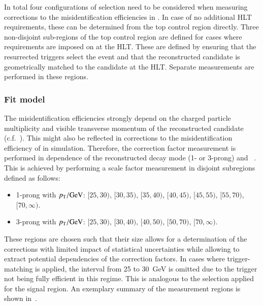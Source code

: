 In total four configurations of \tauhadvis selection need to be
considered when measuring corrections to the \tauhadvis
misidentification efficiencies in \ttbar. In case of no additional HLT
requirements, these can be determined from the top control region
directly. Three non-disjoint sub-regions of the top control region are
defined for cases where requirements are imposed on \tauhadvis at the
HLT. These are defined by ensuring that the resurrected triggers
select the event and that the reconstructed \tauhadvis candidate is
geometrically matched to the \tauhadvis candidate at the HLT. Separate
measurements are performed in these regions.



\subsubsection{Fit model}

The \tauhadvis misidentification efficiencies strongly depend on the
charged particle multiplicity and visible transverse momentum of the
reconstructed \tauhadvis candidate (c.f.\ ). This
might also be reflected in corrections to the misidentification
efficiency of \tauhadvis in simulation. Therefore, the correction
factor measurement is performed in dependence of the reconstructed
decay mode (1- or 3-prong) and \tauhadvis~\pT. This is achieved by
performing a scale factor measurement in disjoint subregions defined
as follows:
\begin{itemize}

\item 1-prong \tauhadvis with $\pT / \si{\GeV}$: $[25, 30)$, $[30, 35)$,
  $[35, 40)$, $[40, 45)$, $[45, 55)$, $[55, 70)$, $[70, \infty)$.

\item 3-prong \tauhadvis with $\pT / \si{\GeV}$: $[25, 30)$, $[30, 40)$,
  $[40, 50)$, $[50, 70)$, $[70, \infty)$.

\end{itemize}
These regions are chosen such that their size allows for a
determination of the corrections with limited impact of statistical
uncertainties while allowing to extract potential \pT dependencies of
the correction factors. In cases where trigger-matching is applied,
the \tauhadvis \pT interval from 25 to \SI{30}{\GeV} is omitted due to
the trigger not being fully efficient in this regime. This is
analogous to the selection applied for the \hadhad signal region. An
exemplary summary of the measurement regions is shown
in~.


